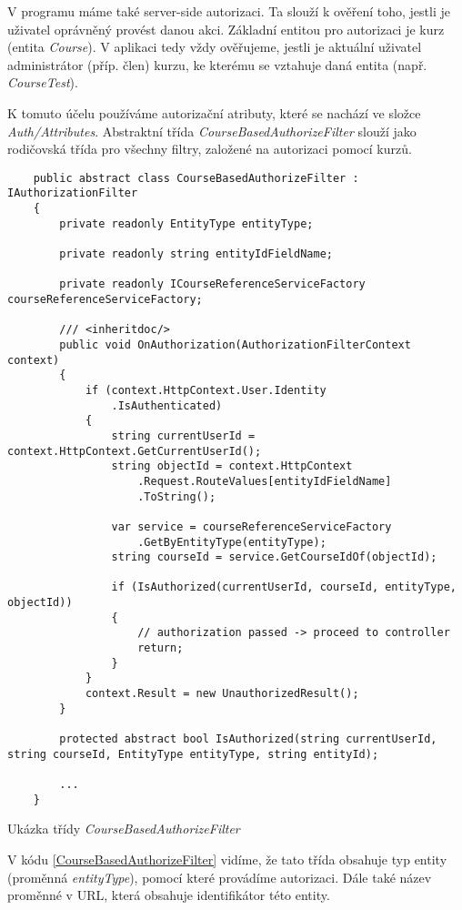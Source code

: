 V programu máme také server-side autorizaci. Ta slouží k ověření toho, jestli je uživatel oprávněný provést danou akci. Základní entitou pro autorizaci je kurz (entita \textit{Course}). V aplikaci tedy vždy ověřujeme, jestli je aktuální uživatel administrátor (příp. člen) kurzu, ke kterému se vztahuje daná entita (např. \textit{CourseTest}).

K tomuto účelu používáme autorizační atributy, které se nachází ve složce \textit{Auth/Attributes}. 
Abstraktní třída \textit{CourseBasedAuthorizeFilter} slouží jako rodičovská třída pro všechny filtry, založené na autorizaci pomocí kurzů.

\begin{program}
	\begin{lstlisting}
	public abstract class CourseBasedAuthorizeFilter : IAuthorizationFilter
	{
		private readonly EntityType entityType;
		
		private readonly string entityIdFieldName;
		
		private readonly ICourseReferenceServiceFactory courseReferenceServiceFactory;
	
		/// <inheritdoc/>
		public void OnAuthorization(AuthorizationFilterContext context)
		{
			if (context.HttpContext.User.Identity
				.IsAuthenticated)
			{
				string currentUserId = context.HttpContext.GetCurrentUserId();
				string objectId = context.HttpContext
					.Request.RouteValues[entityIdFieldName]
					.ToString();
				
				var service = courseReferenceServiceFactory
					.GetByEntityType(entityType);
				string courseId = service.GetCourseIdOf(objectId);
				
				if (IsAuthorized(currentUserId, courseId, entityType, objectId))
				{
					// authorization passed -> proceed to controller
					return;
				}			
			}
			context.Result = new UnauthorizedResult();
		}
		
		protected abstract bool IsAuthorized(string currentUserId, string courseId, EntityType entityType, string entityId);
		
		...
	}
	\end{lstlisting}
	\caption{Ukázka třídy \textit{CourseBasedAuthorizeFilter}}
	\label{CourseBasedAuthorizeFilter}
\end{program}

V kódu \ref{CourseBasedAuthorizeFilter} vidíme, že tato třída obsahuje typ entity (proměnná \textit{entityType}), pomocí které provádíme autorizaci. Dále také název proměnné v URL, která obsahuje identifikátor této entity. 

